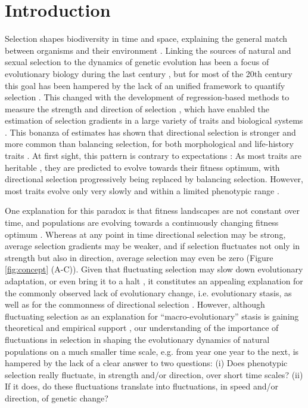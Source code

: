 \section*{Introduction}
Selection shapes biodiversity in time and space, explaining the general match between organisms and their environment \parencite{Darwin1859,Endler1986}. Linking the sources of natural and sexual selection to the dynamics of genetic evolution has been a focus of evolutionary biology during the last century \parencite[e.g.][]{Fisher1958}, but for most of the 20th century this goal has been hampered by the lack of an unified framework to quantify selection \parencite{Wade2006}. This changed with the development of regression-based methods to measure the strength and direction of selection \parencite{Lande1979,Lande1983}, which have enabled the estimation of selection gradients in a large variety of traits and biological systems \parencite{Kingsolver2001,Stinchcombe2008}. This bonanza of estimates has shown that directional selection is stronger and more common than balancing selection, for both morphological and life-history traits \parencite{Kingsolver2001,Hereford2004}. At first sight, this pattern is contrary to expectations \parencite{Kingsolver2011}: As most traits are heritable \parencite{Postma2014}, they are predicted to evolve towards their fitness optimum, with directional selection progressively being replaced by balancing selection. However, most traits evolve only very slowly and within a limited phenotypic range \parencite{Hendry1999, Merila2001, Brookfield2016}. 

One explanation for this paradox is that fitness landscapes are not constant over time, and populations are evolving towards a continuously changing fitness optimum \parencite{Fisher1947,Lande1976}. Whereas at any point in time directional selection may be strong, average selection gradients may be weaker, and if selection fluctuates not only in strength but also in direction, average selection may even be zero (Figure \ref{fig:concept} (A-C)). Given that fluctuating selection may slow down evolutionary adaptation, or even bring it to a halt \parencite{Jones2004,Estes2007}, it constitutes an appealing explanation for the commonly observed lack of evolutionary change, i.e. evolutionary stasis, as well as for the commonness of directional selection \parencite{Merila2001,Robinson2008,Bell2010a}. However, although fluctuating selection as an explanation for ``macro-evolutionary'' stasis is gaining theoretical and empirical support  \parencite{Uyeda2011, Estes2007, Voje2015}, our understanding of the importance of fluctuations in selection in shaping the evolutionary dynamics of natural populations on a much smaller time scale, e.g. from year one year to the next, is hampered by the lack of a clear answer to two questions: (i) Does phenotypic selection really fluctuate, in strength and/or direction, over short time scales? (ii) If it does, do these fluctuations translate into fluctuations, in speed and/or direction, of genetic change?

